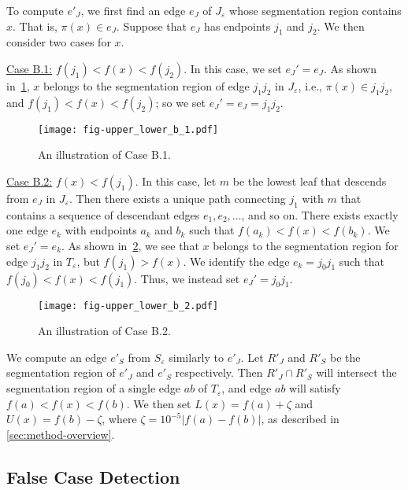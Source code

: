 To compute $e'_J$, we first find an edge $e_J$ of $J_\varepsilon$ whose segmentation region contains $x$. 
That is, $\pi(x) \in e_J$. Suppose that $e_J$ has endpoints $j_1$ and $j_2$. We then consider two cases for $x$.

\underline{Case B.1:} $f(j_1) < f(x) < f(j_2)$. In this case, we set $e_J' = e_J$. As shown in~\cref{fig:upper-lower-b-1}, $x$ belongs to the segmentation region of edge $j_1j_2$ in $J_{\varepsilon}$, i.e., $\pi(x) \in j_1j_2$, and $f(j_1) < f(x) < f(j_2)$; so we set $e_J' = e_J = j_1j_2$.

\begin{figure}[!ht]
\centering
\texttt{[image: fig-upper\_lower\_b\_1.pdf]}
\vspace{-2mm}
\caption{An illustration of Case B.1.}
\label{fig:upper-lower-b-1}
\vspace{-2mm}
\end{figure}

\underline{Case B.2:} $f(x) < f(j_1)$. In this case, let $m$ be the lowest leaf that descends from $e_J$ in $J_\varepsilon$. Then there exists a unique path connecting $j_1$ with $m$ that contains a sequence of descendant edges $e_1, e_2, \ldots$, and so on. There exists exactly one edge $e_k$ with endpoints $a_k$ and $b_k$ such that $f(a_k) < f(x) < f(b_k)$. We set $e_J' = e_k$. As shown in~\cref{fig:upper-lower-b-2}, we see that $x$ belongs to the segmentation region for edge $j_1j_2$ in $T_{\varepsilon}$, but $f(j_1) > f(x)$. We identify the edge $e_k = j_0j_1$ such that $f(j_0) < f(x) < f(j_1)$. Thus, we instead set $e_J' = j_0j_1$. 

\begin{figure}[!ht]
\centering
\texttt{[image: fig-upper\_lower\_b\_2.pdf]}
\vspace{-2mm}
\caption{An illustration of Case B.2.}
\label{fig:upper-lower-b-2}
\vspace{-2mm}
\end{figure}

We compute an edge $e'_S$ from $S_{\varepsilon}$ similarly to $e'_J$. Let $R'_J$ and $R'_S$ be the segmentation region of $e'_J$ and $e'_S$ respectively. 
Then $R'_J \cap R'_S$ will intersect the segmentation region of a single edge $ab$ of $T_{\varepsilon}$, and edge $ab$  will satisfy $f(a) < f(x) < f(b)$. 
We then set $L(x) = f(a) + \zeta$ and $U(x) = f(b) - \zeta$, where $\zeta = 10^{-5}|f(a)-f(b)|$, as described in \cref{sec:method-overview}.

\subsection{False Case Detection}
\label{sec:false-case-figures}

